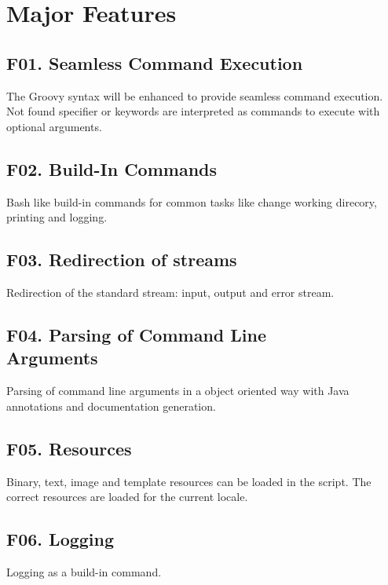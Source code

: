 \section{Major Features}
 
\subsection*{F01. Seamless Command Execution}

The Groovy syntax will be enhanced to provide seamless command execution.
Not found specifier or keywords are interpreted as commands to execute with
optional arguments.

\subsection*{F02. Build-In Commands}

Bash like build-in commands for common tasks like change working direcory,
printing and logging.

\subsection*{F03. Redirection of streams}

Redirection of the standard stream: input, output and error stream.

\subsection*{F04. Parsing of Command Line\\Arguments}

Parsing of command line arguments in a object oriented way with Java
annotations and documentation generation.

\subsection*{F05. Resources}

Binary, text, image and template resources can be loaded in the script.
The correct resources are loaded for the current locale.

\subsection*{F06. Logging}

Logging as a build-in command.
